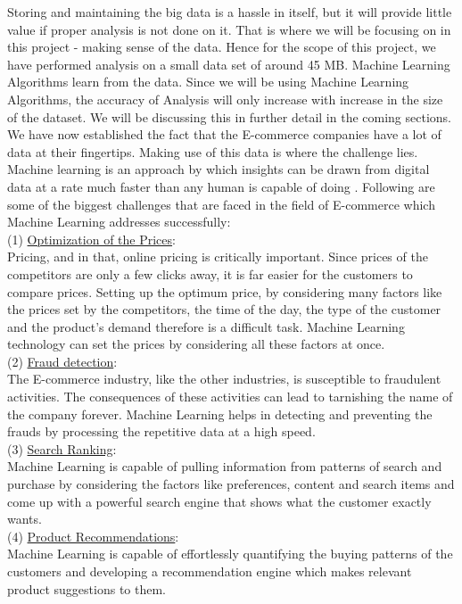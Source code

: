 Storing and maintaining the big data is a hassle in itself, but it will provide little value if proper analysis is not done on it. That is where we will be focusing on in this project - making sense of the data. Hence for the scope of this project, we have performed analysis on a small data set of around 45 MB. Machine Learning Algorithms learn from the data. Since we will be using Machine Learning Algorithms, the accuracy of Analysis will only increase with increase in the size of the dataset. We will be discussing this in further detail in the coming sections.\\
We have now established the fact that the E-commerce companies have a lot of data at their fingertips. Making use of this data is where the challenge lies. Machine learning is an approach by which insights can be drawn from digital data at a rate much faster than any human is capable of doing \cite{link5} . Following are some of the biggest challenges that are faced in the field of E-commerce which Machine Learning addresses successfully:\\
(1) \underline{Optimization of the Prices}:\\
Pricing, and in that, online pricing is critically important. Since prices of the competitors are only a few clicks away, it is far easier for the customers to compare prices. Setting up the optimum price, by considering many factors like the prices set by the competitors, the time of the day, the type of the customer and the product's demand therefore is a difficult task. Machine Learning technology can set the prices by considering all these factors at once.\\
(2) \underline{Fraud detection}: \\
The E-commerce industry, like the other industries, is susceptible to fraudulent activities. The consequences of these activities can lead to tarnishing the name of the company forever. Machine Learning helps in detecting and preventing the frauds by processing the repetitive data at a high speed.\\
(3) \underline{Search Ranking}: \\
Machine Learning is capable of pulling information from patterns of search and purchase by considering the factors like preferences, content and search items and come up with a powerful search engine that shows what the customer exactly wants. \\
(4) \underline{Product Recommendations}: \\
Machine Learning is capable of effortlessly quantifying the buying patterns of the customers and developing a recommendation engine which makes relevant product suggestions to them. \\
